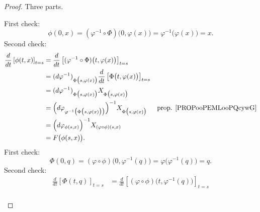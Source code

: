 \begin{proof}
	Three parts.
	\begin{subproof}
		\spitem[\eqref{SUBEQooTGJJooEyvEDJ} \( \Rightarrow\) \eqref{SUBEQSooKJHYooWyRaBO}]
		First check:
		\begin{equation}
			\phi(0,x)=(\varphi^{-1}\circ\Phi)\big( 0,\varphi(x) \big)=\varphi^{-1}\big( \varphi(x) \big)=x.
		\end{equation}
		Second check:
		\begin{subequations}
			\begin{align}
				\frac{d}{dt} \left[ \phi(t,x)  \right]_{t=s} & =\frac{d}{dt} \left[ (\varphi^{-1}\circ\Phi)\big( t,\varphi(x) \big)  \right]_{t=s}                                                                      \\
				                                             & = (d\varphi^{-1})_{\Phi\big( s,\varphi(x) \big)}\frac{d}{dt} \left[ \Phi\big( t,\varphi(x) \big)  \right]_{t=s}                                          \\
				                                             & = (d\varphi^{-1})_{\Phi\big( s,\varphi(x) \big)}X_{\Phi\big( s,\varphi(x) \big)}                                                                         \\
				                                             & = \Big(d\varphi_{\varphi^{-1}\big( \Phi\big( s,\varphi(x) \big) \big)}\Big)^{-1}X_{\Phi\big( s,\varphi(x) \big)} & \text{prop. \ref{PROPooPEMLooPQcywG}} \\
				                                             & = \Big( d\varphi_{\phi(s,x)} \Big)^{-1}X_{(\varphi\circ\phi)(s,x)}                                                                                       \\
				                                             & = F\big( \phi(s,x) \big).
			\end{align}
		\end{subequations}
		\spitem[\eqref{SUBEQSooKJHYooWyRaBO} \( \Rightarrow\) \eqref{SUBEQooTGJJooEyvEDJ}]
		First check:
		\begin{equation}
			\Phi(0,q)=(\varphi\circ \phi)\big( 0,\varphi^{-1}(q) \big)=\varphi\big( \varphi^{-1}(q) \big)=q.
		\end{equation}
		Second check:
		\begin{subequations}
			\begin{align}
				\frac{d}{dt} \left[ \Phi(t,q)  \right]_{t=s} & = \frac{d}{dt} \left[ (\varphi\circ\phi)\big( t,\varphi^{-1}(q) \big)  \right]_{t=s}                              \\

\end{align}
\end{subequations}
\end{subproof}
\end{proof}
